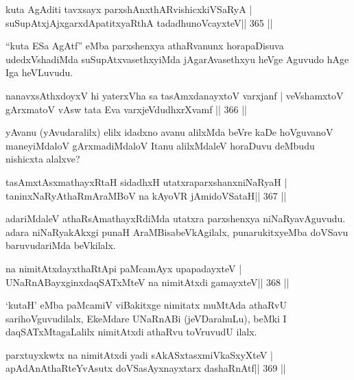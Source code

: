 
\begin{shl}
kuta AgAditi tavxsayx parxshAnxthARvishicxkiVSaRyA |
suSupAtxjAjxgarxdApatitxyaRthA tadadhunoVcayxteV\hfill || 365 ||
\end{shl}

\begin{artha}
``kuta ESa AgAtf'' eMba parxshenxya athaRvanunx horapaDisuva udedxVshadiMda suSupAtxvasethxyiMda jAgarAvasethxyu heVge Aguvudo hAge Iga heVLuvudu.
\end{artha}


\begin{shl}
nanavxsAthxdoyxV hi yaterxVha sa tasAmxdanayxtoV varxjanf |
veVshamxtoV gArxmatoV vA\s sw tata Eva varxjeVdudhxrXvamf \hfill || 366 ||
\end{shl}

\begin{artha}
yAvanu (yAvudaralilx) elilx idadxno avanu alilxMda beVre kaDe hoVgu\-vanoV maneyiMdaloV gArxmadiMdaloV Itanu alilxMdaleV horaDuvu\-	deMbudu nishicxta alalxve?
\end{artha}

\begin{shl}
tasAmxtAsxmathayxRtaH sidadhxH utatxraparxshanxniNaRyaH |
taninxNaRyAthaRmAraMBoV na kAyoVR jAmidoVSataH\hfill || 367 ||
\end{shl}

\begin{artha}
adariMdaleV athaRsAmathayxRdiMda utatxra parxshenxya niNaRyavAguvudu. adara niNaRyakAkxgi punaH AraMBisabeVkAgilalx, punarukitxyeMba doVSavu baruvudariMda beVkilalx.
\end{artha}

\begin{shl}
na nimitAtxdayxthaRtA\s pi paMcamAyx upapadayxteV |
UNaRnABayxginxdaqSATxMteV na nimitAtxdi gamayxteV\hfill || 368 ||
\end{shl}

\begin{artha}
`kutaH' eMba paMcamiV viBakitxge nimitatx muMtAda athaRvU sarihoVgu\-vudilalx, EkeMdare UNaRnABi (jeVDarahuLu), beMki I daqSATxMtagaLalilx nimitAtxdi athaRvu toVruvudU ilalx.
\end{artha}

\begin{shl}
parxtuyxkwtx na nimitAtxdi yadi sAkASxtasxmiVkaSxyXteV |
apAdAnAthaRteYvAsutx doVSasAyxnayxtarx dashaRnAtf\hfill || 369 ||
\end{shl}

